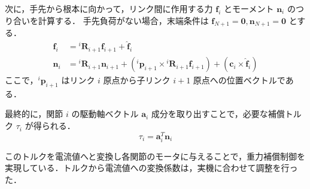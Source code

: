 次に，手先から根本に向かって，リンク間に作用する力 $\boldsymbol{f}_i$ とモーメント $\boldsymbol{n}_i$ のつり合いを計算する．
手先負荷がない場合，末端条件は $\boldsymbol{f}_{N+1} = \boldsymbol{0}, \boldsymbol{n}_{N+1} = \boldsymbol{0}$ とする．
\begin{align}
    \boldsymbol{f}_i &= {}^i\boldsymbol{R}_{i+1} \boldsymbol{f}_{i+1} + \hat{\boldsymbol{f}}_i \\
    \boldsymbol{n}_i &= {}^i\boldsymbol{R}_{i+1} \boldsymbol{n}_{i+1} + ({}^i\boldsymbol{p}_{i+1} \times {}^i\boldsymbol{R}_{i+1} \boldsymbol{f}_{i+1}) + (\boldsymbol{c}_i \times \hat{\boldsymbol{f}}_i)
\end{align}
ここで，${}^i\boldsymbol{p}_{i+1}$ はリンク $i$ 原点から子リンク $i+1$ 原点への位置ベクトルである．

最終的に，関節 $i$ の駆動軸ベクトル $\boldsymbol{a}_i$ 成分を取り出すことで，必要な補償トルク $\tau_i$ が得られる．
\begin{equation}
    \tau_i = \boldsymbol{a}_i^T \boldsymbol{n}_i
\end{equation}\par
このトルクを電流値へと変換し各関節のモータに与えることで，重力補償制御を実現している．トルクから電流値への変換係数は，実機に合わせて調整を行った．













